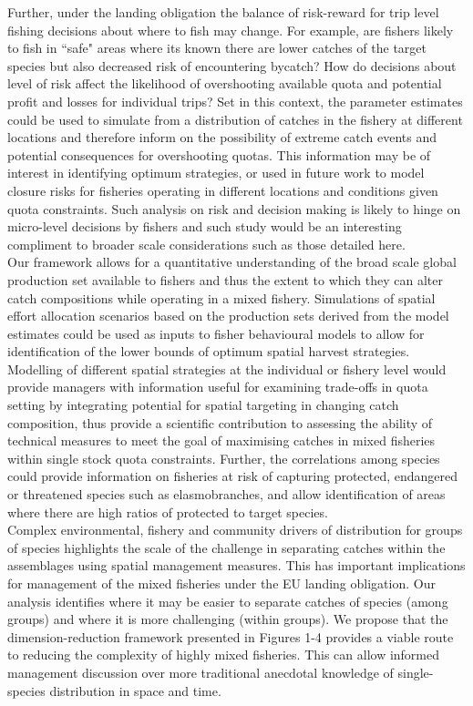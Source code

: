 \documentclass[fleqn,10pt]{wlscirep}
\begin{document}
\begin{linenumbers}
Further, under the landing obligation the balance of risk-reward for trip level
fishing decisions about where to fish may change. For example, are fishers
likely to fish in ``safe" areas where its known there are lower catches of the
target species but also decreased risk of encountering bycatch? How do
decisions about level of risk affect the likelihood of overshooting available
quota and potential profit and losses for individual trips? Set in this
context, the parameter estimates could be used to simulate from a distribution
of catches in the fishery at different locations and therefore inform on the
possibility of extreme catch events and potential consequences for overshooting
quotas. This information may be of interest in identifying optimum strategies,
or used in future work to model closure risks for fisheries operating in
different locations and conditions given quota constraints. Such analysis on
risk and decision making is likely to hinge on micro-level decisions by fishers
and such study would be an interesting compliment to broader scale
considerations such as those detailed here. \\

Our framework allows for a quantitative understanding of the broad scale global
production set available to fishers\cite{Reimer2017} and thus the extent to
which they can alter catch compositions while operating in a mixed fishery.
Simulations of spatial effort allocation scenarios based on the production sets
derived from the model estimates could be used as inputs to fisher behavioural
models to allow for identification of the lower bounds of optimum spatial
harvest strategies. Modelling of different spatial strategies at the individual
or fishery level would provide managers with information useful for examining
trade-offs in quota setting by integrating potential for spatial targeting in
changing catch composition, thus provide a scientific contribution to assessing
the ability of technical measures to meet the goal of maximising catches in
mixed fisheries within single stock quota constraints\cite{Ulrich2016}.
Further, the correlations among species could provide information on fisheries
at risk of capturing protected, endangered or threatened species such as
elasmobranches, and allow identification of areas where there are high ratios
of protected to target species.\\

Complex environmental, fishery and community drivers of distribution for groups
of species highlights the scale of the challenge in separating catches within
the assemblages using spatial management measures. This has important
implications for management of the mixed fisheries under the EU landing
obligation. Our analysis identifies where it may be easier to separate catches
of species (among groups) and where it is more challenging (within groups). We
propose that the dimension-reduction framework presented in Figures 1-4
provides a viable route to reducing the complexity of highly mixed fisheries.
This can allow informed management discussion over more traditional anecdotal
knowledge of single-species distribution in space and time.\\


\end{linenumbers}
\end{document}
